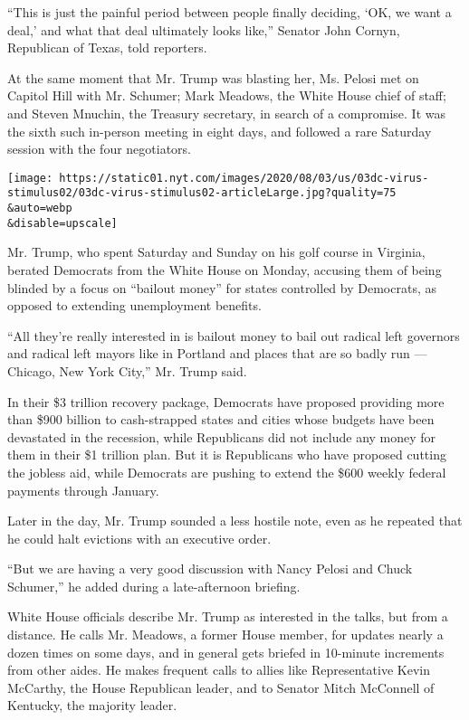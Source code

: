 ``This is just the painful period between people finally deciding, `OK,
we want a deal,' and what that deal ultimately looks like,'' Senator
John Cornyn, Republican of Texas, told reporters.

At the same moment that Mr. Trump was blasting her, Ms. Pelosi met on
Capitol Hill with Mr. Schumer; Mark Meadows, the White House chief of
staff; and Steven Mnuchin, the Treasury secretary, in search of a
compromise. It was the sixth such in-person meeting in eight days, and
followed a rare Saturday session with the four negotiators.

\texttt{[image: https://static01.nyt.com/images/2020/08/03/us/03dc-virus-stimulus02/03dc-virus-stimulus02-articleLarge.jpg?quality=75\\\&auto=webp\\\&disable=upscale]}

Mr. Trump, who spent Saturday and Sunday on his golf course in Virginia,
berated Democrats from the White House on Monday, accusing them of being
blinded by a focus on ``bailout money'' for states controlled by
Democrats, as opposed to extending unemployment benefits.

``All they're really interested in is bailout money to bail out radical
left governors and radical left mayors like in Portland and places that
are so badly run --- Chicago, New York City,'' Mr. Trump said.

In their \$3 trillion recovery package, Democrats have proposed
providing more than \$900 billion to cash-strapped states and cities
whose budgets have been devastated in the recession, while Republicans
did not include any money for them in their \$1 trillion plan. But it is
Republicans who have proposed cutting the jobless aid, while Democrats
are pushing to extend the \$600 weekly federal payments through January.

Later in the day, Mr. Trump sounded a less hostile note, even as he
repeated that he could halt evictions with an executive order.

``But we are having a very good discussion with Nancy Pelosi and Chuck
Schumer,'' he added during a late-afternoon briefing.

White House officials describe Mr. Trump as interested in the talks, but
from a distance. He calls Mr. Meadows, a former House member, for
updates nearly a dozen times on some days, and in general gets briefed
in 10-minute increments from other aides. He makes frequent calls to
allies like Representative Kevin McCarthy, the House Republican leader,
and to Senator Mitch McConnell of Kentucky, the majority leader.

